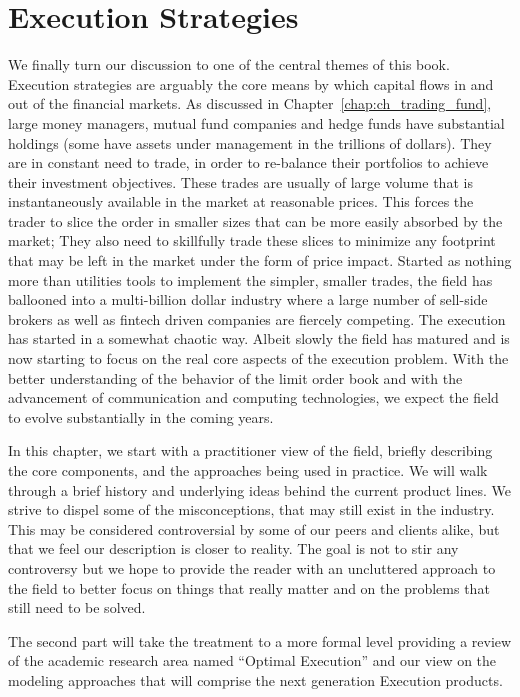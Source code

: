 \chapter{Execution Strategies\label{chap:ch_exec_models}} \label{in:exec_alg1}

We finally turn our discussion to one of the central themes of this book. Execution strategies are arguably the core means by which capital flows in and out of the financial markets.  As discussed in Chapter~\ref{chap:ch_trading_fund}, large money managers, mutual fund companies and hedge funds have substantial holdings (some have assets under management in the trillions of dollars). They are in constant need to trade, in order to re-balance their portfolios to achieve their investment objectives. These trades are usually of large volume that is instantaneously available in the market at reasonable prices. This forces the trader to slice the order in smaller sizes that can be more easily absorbed by the market; They also need to skillfully trade these slices to minimize any footprint that may be left in the market under the form of price impact. Started as nothing more than utilities tools to implement the simpler, smaller trades, the field has ballooned into a multi-billion dollar industry where a large number of sell-side brokers as well as fintech driven companies are fiercely competing. The execution has started in a somewhat chaotic way. Albeit slowly the field has matured and is now starting to focus on the real core aspects of the execution problem. With the better understanding of the behavior of the limit order book and with the advancement of communication and computing technologies, we expect the field to evolve substantially in the coming years.


In this chapter, we start with a practitioner view of the field, briefly describing the core components, and the approaches being used in practice. We will walk through a brief history and underlying ideas behind the current product lines. We strive to dispel some of the misconceptions, that may still exist in the industry. This may be considered controversial by some of our peers and clients alike, but that we feel our description is closer to reality. The goal is not to stir any controversy but we hope to provide the reader with an uncluttered approach to the field to better focus on things that really matter and on the problems that still need to be solved.


The second part will take the treatment to a more formal level providing a review of the academic research area named ``Optimal Execution'' and our view on the modeling approaches that will comprise the next generation Execution products.



